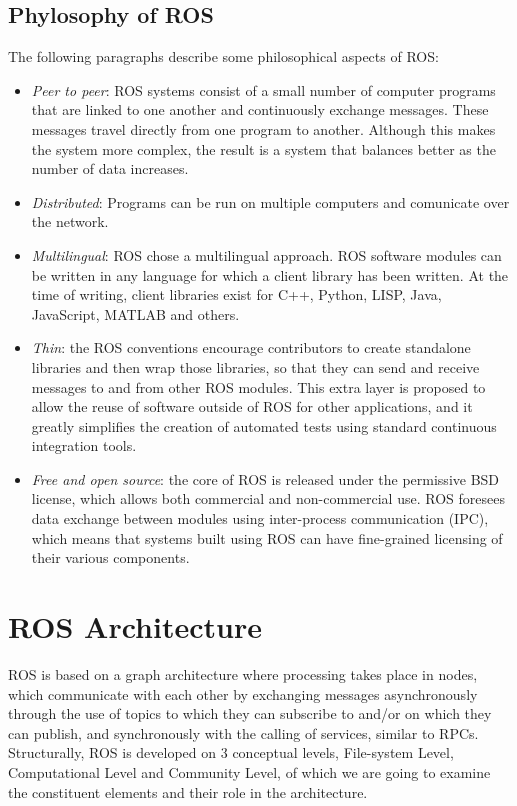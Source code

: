  \subsection{Phylosophy of ROS}
The following paragraphs describe some philosophical aspects of ROS:\\
\begin{itemize}
\item \textit{Peer to peer}: ROS systems consist of a small number of computer programs that are linked to one another and continuously exchange messages. These messages travel directly from one program to another. Although this makes the system more complex, the result is a system that balances better as the number of data increases.\\
\item \textit{Distributed}: Programs can be run on multiple computers and comunicate over the network.
\item \textit{Multilingual}: ROS chose a multilingual approach. ROS software modules can be written in any language for which a client library has been written. At the time of writing, client libraries exist for C++, Python, LISP, Java, JavaScript, MATLAB and others.\\
\item \textit{Thin}: the ROS conventions encourage contributors to create standalone libraries and then wrap those libraries, so that they can send and receive messages to and from other ROS modules. This extra layer is proposed to allow the reuse of software outside of ROS for other applications, and it greatly simplifies the creation of automated tests using standard continuous integration tools.\\
\item \textit{Free and open source}: the core of ROS is released under the permissive BSD license, which allows both commercial and non-commercial use. ROS foresees data exchange between modules using inter-process communication (IPC), which means that systems built using ROS can have fine-grained licensing of their various components.\\
\end{itemize}

\section{ROS Architecture}
ROS is based on a graph architecture where processing takes place in nodes, which communicate with each other by exchanging messages asynchronously through the use of topics to which they can subscribe to and/or on which they can publish, and synchronously with the calling of services, similar to RPCs.  Structurally, ROS is developed on 3 conceptual levels, File-system Level, Computational Level and Community Level, of which we are going to examine the constituent elements and their role in the architecture.
